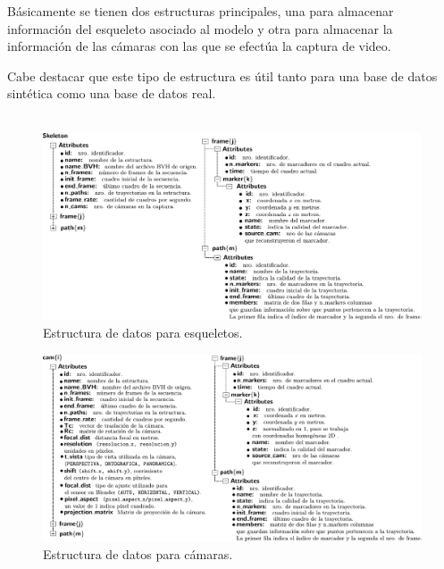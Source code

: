 Básicamente se tienen dos estructuras principales, una para almacenar información del esqueleto asociado al modelo y otra para almacenar la información de las cámaras con las que se efectúa la captura de video.

Cabe destacar que este tipo de estructura es útil tanto para una base de datos sintética como una base de datos real. \\
\\

\begin{figure}[ht!]
   \hspace{-1.2cm}
   \includegraphics[scale=0.6]{img/Base_Datos/Estructura_datos_skeleton.pdf}
   \caption{Estructura de datos para esqueletos.}  
   \label{img_estructura_skeleton} 
 \end{figure} 

\begin{figure}[ht!]
   \hspace{-1.2cm}
   \includegraphics[scale=0.6]{img/Base_Datos/Estructura_datos_cam.pdf}
   \caption{Estructura de datos para cámaras.}
   \label{img_estructura_cam}    
 \end{figure} 


